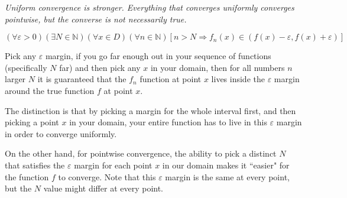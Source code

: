 \documentclass[12pt,letterpaper]{article}
\def\eps{\varepsilon{}}
\newcommand{\N}{{\mathbb N}}
\begin{document}
\begin{multicols*}{2}
        {\it Uniform convergence is stronger. Everything that converges
        uniformly converges pointwise, but the converse is not necessarily
        true.}

        \[
            (\forall \eps > 0)(\exists N \in \N)(\forall x \in D)(\forall n \in \N)
            [n > N \Rightarrow f_n(x) \in (f(x) - \eps, f(x) + \eps)]
        \]

        Pick any $\eps$ margin, if you go far enough out in your sequence of
        functions (specifically $N$ far) and then pick any $x$ in your domain,
        then for all numbers $n$ larger $N$ it is guaranteed that the ${f_n}$
        function at point $x$ lives inside the $\eps$ margin around the true
        function $f$ at point $x$.

        The distinction is that by picking a margin for the whole interval
        first, and then picking a point $x$ in your domain, your entire
        function has to live in this $\eps$ margin in order to converge
        uniformly.

        On the other hand, for pointwise convergence, the ability to pick a
        distinct $N$ that satisfies the $\eps$ margin for each point $x$ in
        our domain makes it ``easier" for the function $f$ to converge. Note
        that this $\eps$ margin is the same at every point, but the $N$ value
        might differ at every point.

    \end{multicols*}
\end{document}
